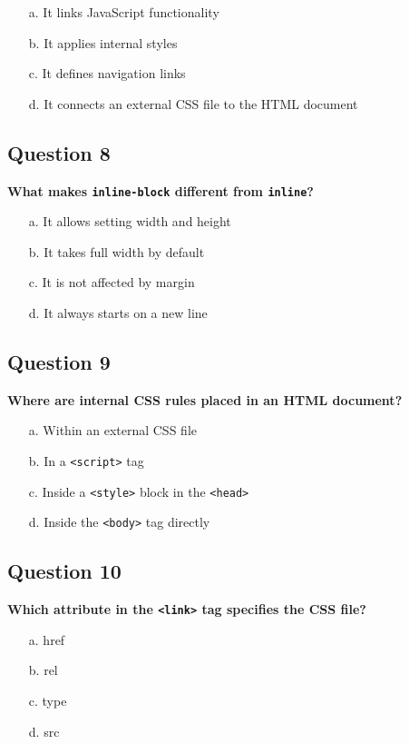 \documentclass{article}
\begin{document}
\begin{itemize}
  \item[a.] It links JavaScript functionality
  \item[b.] It applies internal styles
  \item[c.] It defines navigation links
  \item[d.] It connects an external CSS file to the HTML document
\end{itemize}

\subsection*{Question 8}
\textbf{What makes \texttt{inline-block} different from \texttt{inline}?}

\begin{itemize}
  \item[a.] It allows setting width and height
  \item[b.] It takes full width by default
  \item[c.] It is not affected by margin
  \item[d.] It always starts on a new line
\end{itemize}

\subsection*{Question 9}
\textbf{Where are internal CSS rules placed in an HTML document?}

\begin{itemize}
  \item[a.] Within an external CSS file
  \item[b.] In a \texttt{<script>} tag
  \item[c.] Inside a \texttt{<style>} block in the \texttt{<head>}
  \item[d.] Inside the \texttt{<body>} tag directly
\end{itemize}

\subsection*{Question 10}
\textbf{Which attribute in the \texttt{<link>} tag specifies the CSS file?}

\begin{itemize}
  \item[a.] href
  \item[b.] rel
  \item[c.] type
  \item[d.] src
\end{itemize}
\end{document}
